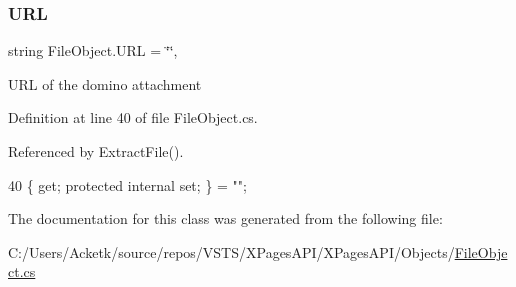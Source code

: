 \subsubsection{\texorpdfstring{U\+RL}{URL}}
{\footnotesize\ttfamily string File\+Object.\+U\+RL = \char`\"{}\char`\"{}\hspace{0.3cm}{\ttfamily [get]}, {\ttfamily [set]}}



U\+RL of the domino attachment 



Definition at line 40 of file File\+Object.\+cs.



Referenced by Extract\+File().


\begin{DoxyCode}
40 \{ \textcolor{keyword}{get}; \textcolor{keyword}{protected} \textcolor{keyword}{internal} \textcolor{keyword}{set}; \} = \textcolor{stringliteral}{""};
\end{DoxyCode}


The documentation for this class was generated from the following file\+:\begin{DoxyCompactItemize}
\item 
C\+:/\+Users/\+Acketk/source/repos/\+V\+S\+T\+S/\+X\+Pages\+A\+P\+I/\+X\+Pages\+A\+P\+I/\+Objects/\mbox{\hyperlink{_file_object_8cs}{File\+Object.\+cs}}\end{DoxyCompactItemize}
